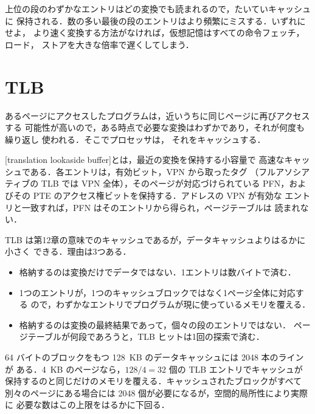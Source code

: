 \documentclass[../main.tex]{subfiles}
\begin{document}
上位の段のわずかなエントリはどの変換でも読まれるので，たいていキャッシュに
保持される．数の多い最後の段のエントリはより頻繁にミスする．いずれにせよ，
より速く変換する方法がなければ，仮想記憶はすべての命令フェッチ，ロード，
ストアを大きな倍率で遅くしてしまう．

\section{TLB}
\label{sec:l13-tlb}

あるページにアクセスしたプログラムは，近いうちに同じページに再びアクセスする
可能性が高いので，ある時点で必要な変換はわずかであり，それが何度も繰り返し
使われる．そこでプロセッサは，
それをキャッシュする．

\begin{definition}[TLB]
  [translation lookaside buffer]とは，最近の変換を保持する小容量で
  高速なキャッシュである．各エントリは，有効ビット，VPN から取ったタグ
  （フルアソシアティブの TLB では VPN 全体），そのページが対応づけられている
  PFN，およびその PTE のアクセス権ビットを保持する．アドレスの VPN が有効な
  エントリと一致すれば，PFN はそのエントリから得られ，ページテーブルは
  読まれない．
\end{definition}

TLB は第12章の意味でのキャッシュであるが，データキャッシュよりはるかに小さく
できる．理由は3つある．
\begin{itemize}
  \item 格納するのは変換だけでデータではない．1エントリは数バイトで済む．
  \item 1つのエントリが，1つのキャッシュブロックではなく1ページ全体に対応する
    ので，わずかなエントリでプログラムが現に使っているメモリを覆える．
  \item 格納するのは変換の最終結果であって，個々の段のエントリではない．
    ページテーブルが何段であろうと，TLB ヒットは1回の探索で済む．
\end{itemize}

\begin{example}
  \label{ex:l13-tlb-size}
  64 バイトのブロックをもつ 128~KB のデータキャッシュには 2048 本のラインが
  ある．4~KB のページなら，$128/4 = 32$ 個の TLB エントリでキャッシュが
  保持するのと同じだけのメモリを覆える．キャッシュされたブロックがすべて
  別々のページにある場合には 2048 個が必要になるが，空間的局所性により実際に
  必要な数はこの上限をはるかに下回る．
\end{example}
\end{document}
